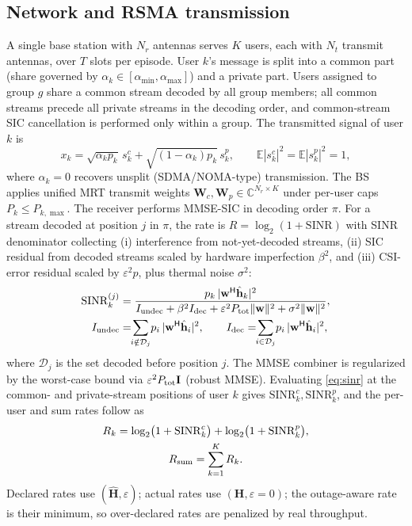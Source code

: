 \documentclass[journal]{IEEEtran}
\newcommand{\vect}[1]{\mathbf{#1}}
\begin{document}
\subsection{Network and RSMA transmission}
A single base station with $N_r$ antennas serves $K$ users, each with $N_t$
transmit antennas, over $T$ slots per episode. User $k$'s message is split into a
common part (share governed by $\alpha_k \in [\alpha_{\min},\alpha_{\max}]$) and a
private part. Users assigned to group $g$ share a common stream decoded by all
group members; all common streams precede all private streams in the decoding
order, and common-stream SIC cancellation is performed only within a group. The
transmitted signal of user $k$ is
\begin{equation}
x_k = \sqrt{\alpha_k p_k}\, s_k^c + \sqrt{(1-\alpha_k) p_k}\, s_k^p,\qquad
\mathbb{E}|s_k^c|^2 = \mathbb{E}|s_k^p|^2 = 1,
\label{eq:tx}
\end{equation}
where $\alpha_k=0$ recovers unsplit (SDMA/NOMA-type) transmission. The BS applies
unified MRT transmit weights
$\vect{W}_c,\vect{W}_p \in \mathbb{C}^{N_r\times K}$ under per-user caps
$P_k \le P_{k,\max}$. The receiver performs MMSE-SIC in decoding order $\pi$. For
a stream decoded at position $j$ in $\pi$, the rate is $R=\log_2(1+\mathrm{SINR})$
with SINR denominator collecting (i) interference from not-yet-decoded streams,
(ii) SIC residual from decoded streams scaled by hardware imperfection
$\beta^2$, and (iii) CSI-error residual scaled by $\varepsilon^2 p$, plus thermal
noise $\sigma^2$:
\begin{equation}
\begin{split}
\mathrm{SINR}_{k}^{(j)} &= \frac{p_k\,|\vect{w}^{\mathsf H}\hat{\vect{h}}_k|^2}
{I_{\rm undec} + \beta^2 I_{\rm dec} + \varepsilon^2 P_{\rm tot}\|\vect{w}\|^2 + \sigma^2\|\vect{w}\|^2},\\
I_{\rm undec} &= \!\!\sum_{i\notin\mathcal{D}_j}\! p_i\,|\vect{w}^{\mathsf H}\hat{\vect{h}}_i|^2,\qquad
I_{\rm dec} = \!\!\sum_{i\in\mathcal{D}_j}\! p_i\,|\vect{w}^{\mathsf H}\hat{\vect{h}}_i|^2,
\end{split}
\label{eq:sinr}
\end{equation}
where $\mathcal{D}_j$ is the set decoded before position $j$. The MMSE combiner is
regularized by the worst-case bound via $\varepsilon^2 P_{\rm tot}\vect{I}$
(robust MMSE). Evaluating \eqref{eq:sinr} at the common- and private-stream
positions of user $k$ gives $\mathrm{SINR}_k^c,\mathrm{SINR}_k^p$, and the
per-user and sum rates follow as
\begin{multline}
R_k = \log_2\!\big(1+\mathrm{SINR}_k^c\big) + \log_2\!\big(1+\mathrm{SINR}_k^p\big),\\
R_{\rm sum} = \sum_{k=1}^{K} R_k.
\label{eq:rates}
\end{multline}
Declared rates use $(\hat{\vect{H}},\varepsilon)$; actual rates use
$(\vect{H},\varepsilon{=}0)$; the outage-aware rate is their minimum, so
over-declared rates are penalized by real throughput.
\end{document}
